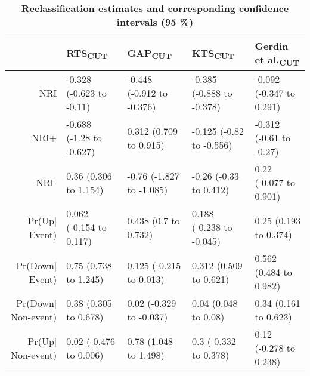 \begin{table}[!ht]
\centering
\caption{\bf Reclassification estimates and corresponding confidence intervals (95 \%)} 
\label{table:reclassification}
\begin{adjustbox}{max width = \linewidth} 
\begin{tabular} 
{rllll}
  \toprule
 & RTS\textsubscript{CUT} & GAP\textsubscript{CUT} & KTS\textsubscript{CUT} & Gerdin et al.\textsubscript{CUT} \\ 
  \midrule
NRI & -0.328 (-0.623 to -0.11) & -0.448 (-0.912 to -0.376) & -0.385 (-0.888 to -0.378) & -0.092 (-0.347 to 0.291) \\ 
  NRI+ & -0.688 (-1.28 to -0.627) & 0.312 (0.709 to 0.915) & -0.125 (-0.82 to -0.556) & -0.312 (-0.61 to -0.27) \\ 
  NRI- & 0.36 (0.306 to 1.154) & -0.76 (-1.827 to -1.085) & -0.26 (-0.33 to 0.412) & 0.22 (-0.077 to 0.901) \\ 
  Pr(Up$|$Event) & 0.062 (-0.154 to 0.117) & 0.438 (0.7 to 0.732) & 0.188 (-0.238 to -0.045) & 0.25 (0.193 to 0.374) \\ 
  Pr(Down$|$Event) & 0.75 (0.738 to 1.245) & 0.125 (-0.215 to 0.013) & 0.312 (0.509 to 0.621) & 0.562 (0.484 to 0.982) \\ 
  Pr(Down$|$Non-event) & 0.38 (0.305 to 0.678) & 0.02 (-0.329 to -0.037) & 0.04 (0.048 to 0.08) & 0.34 (0.161 to 0.623) \\ 
  Pr(Up$|$Non-event) & 0.02 (-0.476 to 0.006) & 0.78 (1.048 to 1.498) & 0.3 (-0.332 to 0.378) & 0.12 (-0.278 to 0.238) \\ 
   \bottomrule
\end{tabular} 
\end{adjustbox}
\end{table}

